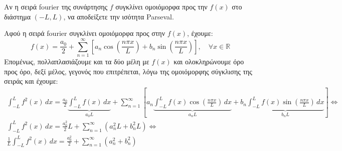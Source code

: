 \begin{example}
  Αν η σειρά fourier της συνάρτησης $f$ συγκλίνει ομοιόμορφα προς την $f(x)$ στο 
  διάστημα $ (-L,L) $, να αποδείξετε την ισότητα Parseval.
\end{example}
\begin{solution}
  Αφού η σειρά fourier συγκλίνει ομοιόμορφα προς στην $ f(x) $, έχουμε:
  \[
    f(x) = \frac{a_{0}}{2} + \sum_{n=1}^{\infty} \left[a_{n} 
    \cos{\left(\frac{n \pi x}{L}\right)} + b_{n} \sin{\left(\frac{n \pi x}{L}\right)}\right], 
    \quad \forall x \in \mathbb{R} 
  \] 
  Επομένως, πολλαπλασιάζουμε και τα δύο μέλη με $ f(x) $ και ολοκληρώνουμε όρο 
  προς όρο, δεξί μέλος, γεγονός που επιτρέπεται, λόγω της ομοιόμορφης σύγκλισης της 
  σειράς και έχουμε:
  \begin{gather*}
    \int _{-L}^{L} f^{2}(x) \,{dx} 
    = \frac{a_{0}}{2} \underbrace{\int _{-L}^{L} f(x) \,{dx}}_{a_{0}L} + 
    \sum_{n=1}^{\infty} \left[a_{n} \underbrace{\int _{-L}^{L} f(x) 
      \cos{\left(\frac{n \pi x}{L}\right)} \,{dx}}_{a_{n}L} + b_{n} 
      \underbrace{\int _{-L}^{L} f(x) \sin{\left(\frac{n \pi x}{L}\right)} 
    \,{dx}}_{b_{n}L} \right] \Leftrightarrow \\ 
    \int _{-L}^{L} f^{2}(x) \,{dx}  = \frac{a_{0}^{2}}{2} L + 
    \sum_{n=1}^{\infty} (a_{n}^{2}L+b_{n}^{2}L) \Leftrightarrow \\
    \frac{1}{L} \int _{-L}^{L} f^{2}(x) \,{dx}  = \frac{a_{0}^{2}}{2}
    + \sum_{n=1}^{\infty} (a_{n}^{2}+b_{n}^{2}) \\
  \end{gather*}
\end{solution}







